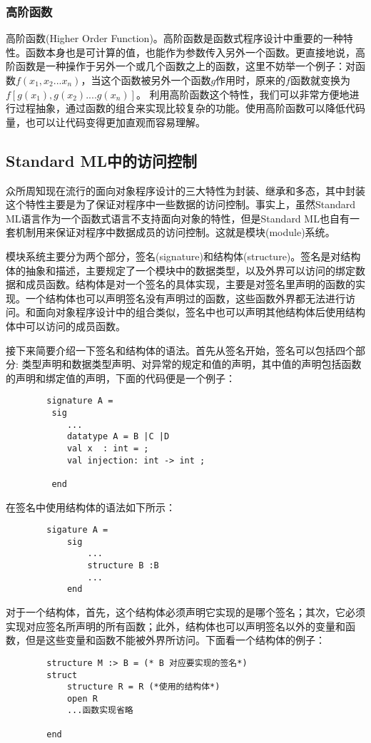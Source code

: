 \documentclass[openany,oneside]{book}
\theoremstyle{definition}
\theoremstyle{definition}
\begin{document}
	\subsubsection*{高阶函数}
	高阶函数(Higher Order Function)。高阶函数是函数式程序设计中重要的一种特性。函数本身也是可计算的值，也能作为参数传入另外一个函数。更直接地说，高阶函数是一种操作于另外一个或几个函数之上的函数，这里不妨举一个例子：对函数\(f\left(x_1,x_2...x_n \right) \)，当这个函数被另外一个函数\(g\)作用时，原来的\(f\)函数就变换为\(f\left[ g\left( x_1\right) ,g\left( x_2\right) ....g\left( x_n\right)\right]    \)。
	利用高阶函数这个特性，我们可以非常方便地进行过程抽象，通过函数的组合来实现比较复杂的功能。使用高阶函数可以降低代码量，也可以让代码变得更加直观而容易理解。
	\subsection{Standard ML中的访问控制}
	众所周知现在流行的面向对象程序设计的三大特性为封装、继承和多态，其中封装这个特性主要是为了保证对程序中一些数据的访问控制。事实上，虽然Standard ML语言作为一个函数式语言不支持面向对象的特性，但是Standard ML也自有一套机制用来保证对程序中数据成员的访问控制。这就是模块(module)系统\cite{harper1989introduction}。
	
	
	模块系统主要分为两个部分，签名(signature)和结构体(structure)。签名是对结构体的抽象和描述，主要规定了一个模块中的数据类型，以及外界可以访问的绑定数据和成员函数。结构体是对一个签名的具体实现，主要是对签名里声明的函数的实现。一个结构体也可以声明签名没有声明过的函数，这些函数外界都无法进行访问。和面向对象程序设计中的组合类似，签名中也可以声明其他结构体后使用结构体中可以访问的成员函数。 
	
	接下来简要介绍一下签名和结构体的语法。首先从签名开始，签名可以包括四个部分: 类型声明和数据类型声明、对异常的规定和值的声明，其中值的声明包括函数的声明和绑定值的声明，下面的代码便是一个例子：
	\begin{lstlisting}
		signature A =
		 sig
			...
			datatype A = B |C |D
			val x  : int = ;
			val injection: int -> int ; 
		    
		 end
	\end{lstlisting}
	在签名中使用结构体的语法如下所示：
	\begin{lstlisting}
		sigature A =
			sig 
				...
				structure B :B
				...
			end
	\end{lstlisting}
	对于一个结构体，首先，这个结构体必须声明它实现的是哪个签名；其次，它必须实现对应签名所声明的所有函数；此外，结构体也可以声明签名以外的变量和函数，但是这些变量和函数不能被外界所访问。下面看一个结构体的例子：
	\begin{lstlisting}
		structure M :> B = (* B 对应要实现的签名*)
		struct
			structure R = R (*使用的结构体*)
			open R
			...函数实现省略
			
		end
	\end{lstlisting}	
	
\end{document}
